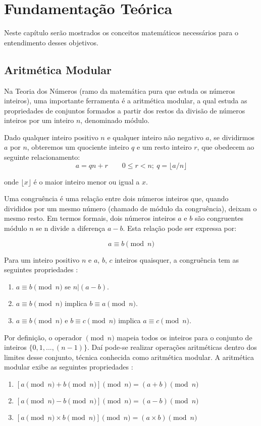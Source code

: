 \chapter{Fundamentação Teórica}
Neste capítulo serão mostrados os conceitos matemáticos necessários para o entendimento desses objetivos.

%
%
\section{Aritmética Modular}
Na Teoria dos Números \cite{Niven:2014} (ramo da matemática pura que estuda os números inteiros), uma importante ferramenta é a aritmética modular,  a qual estuda as propriedades de conjuntos formados a partir dos restos da divisão de números inteiros por um inteiro \(n\), denominado módulo.

Dado qualquer inteiro positivo \(n\) e qualquer inteiro não negativo \(a\), se dividirmos \(a\) por \(n\), obteremos um quociente inteiro \(q\) e um resto inteiro \(r\), que obedecem ao seguinte relacionamento:
\begin{equation}
  a=qn+r \qquad 0 \leq r<n;\ q=\lfloor a/n \rfloor
\end{equation}

onde $\lfloor x \rfloor$ é o maior inteiro menor ou igual a \(x\).

Uma congruência é  uma relação entre dois números inteiros que, quando divididos por um mesmo número (chamado de módulo da congruência), deixam o mesmo resto.  Em termos formais, dois números inteiros \(a\) e \(b\) são congruentes módulo \(n\) se n divide a diferença \(a - b\).  Esta relação pode ser expressa por:

\begin{equation}
  a \equiv b \pmod n \label{eq:1}
\end{equation}

Para um inteiro positivo \(n\) e \(a\), \(b\), \(c\) inteiros quaisquer, a congruência tem as seguintes propriedades \cite{Stallings:2011}:
\begin{enumerate}
  \item $a \equiv b \pmod n$ se $n|(a - b)$.
  \item $a \equiv b \pmod n$ implica $b \equiv a \pmod n$.
  \item $a \equiv b \pmod n$ e $b \equiv c \pmod n$ implica $a \equiv c \pmod n$.
\end{enumerate}

Por definição, o operador $\pmod n$ mapeia todos os inteiros para o conjunto de inteiros $\{0, 1, ..., (n-1)\}$. Daí pode-se realizar operações aritméticas dentro dos limites desse conjunto, técnica conhecida como aritmética modular. A aritmética modular exibe as seguintes propriedades \cite{Stallings:2011}:
\begin{enumerate}
  \item $[a \pmod n + b \pmod n] \pmod n = (a + b) \pmod n$
  \item $[a \pmod n - b \pmod n] \pmod n = (a - b) \pmod n$
  \item $[a \pmod n \times b \pmod n] \pmod n = (a \times b) \pmod n$
\end{enumerate}

